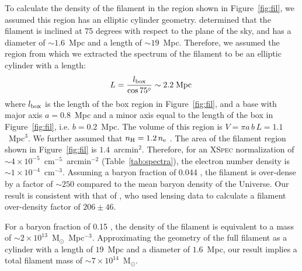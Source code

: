 To calculate the density of the filament in the region shown in Figure~\ref{fig:fil}, we assumed this region has an elliptic cylinder geometry. \citet{Jauzac2012} determined that the filament is inclined at 75 degrees with respect to the plane of the sky, and has a diameter of $\sim 1.6$~Mpc and a length of $\sim 19$~Mpc. Therefore, we assumed the region from which we extracted the spectrum of the filament to be an elliptic cylinder with a length:
\begin{equation}
	L = \frac{l_{\rm box}}{\cos{75^{\circ}}} \sim 2.2 \; {\rm Mpc}\, 
\end{equation}
where $l_{\rm box}$ is the length of the box region in Figure~\ref{fig:fil}, and a base with major axis $a = 0.8$~Mpc and a minor axis equal to the length of the box in Figure~\ref{fig:fil}, i.e. $b = 0.2$~Mpc. The volume of this region is $V = \pi a\, b \, L = 1.1$~Mpc$^3$. We further assumed that $n_{\rm H} = 1.2 \, n_{\rm e}$ \citep{Bohringer2010}. The area of the filament region shown in Figure~\ref{fig:fil} is $1.4$~arcmin$^2$. Therefore, for an \textsc{XSpec} normalization of $\sim 4\times 10^{-5}$~cm$^{-5}$~arcmin${^{-2}}$ (Table~\ref{tab:spectra}), the electron number density is $\sim 1\times 10^{-4}$~cm$^{-3}$. Assuming a baryon fraction of 0.044 \citep{Kirkman2003}, the filament is over-dense by a factor of $\sim 250$ compared to the mean baryon density of the Universe. Our result is consistent with that of \citet{Jauzac2012}, who used lensing data to calculate a filament over-density factor of $206 \pm 46$.

For a baryon fraction of 0.15 \citep{Mantz2014}, the density of the filament is equivalent to a mass of $\sim 2\times 10^{13}$~M$_{\odot}$~Mpc$^{-3}$.  Approximating the geometry of the full filament as a cylinder with a length of $19$~Mpc and a diameter of $1.6$~Mpc, our result implies a total filament mass of $\sim 7\times 10^{14}$~M$_\odot$. 





